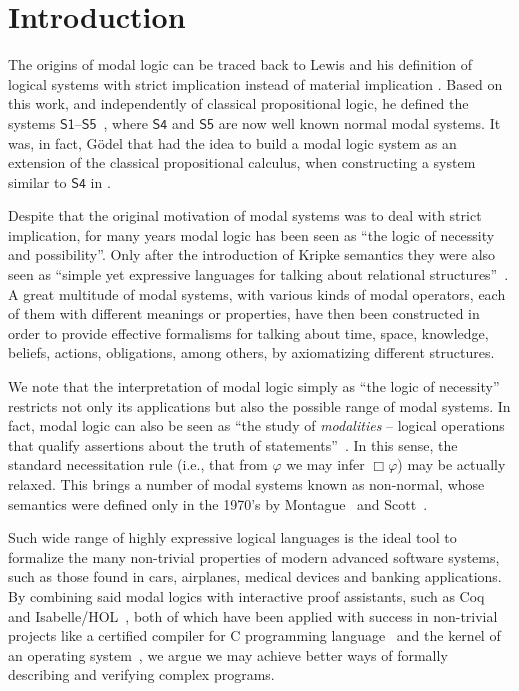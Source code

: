 \documentclass[3p,times]{elsarticle}
\begin{document}

\section{Introduction}\label{sec:intro}


The origins of modal logic can be traced back to Lewis and his definition of
logical systems with strict implication instead of material implication \cite{Lewis1918}.
Based on this work, and independently of classical propositional logic, he
defined the systems $\mathsf{S1}$--$\mathsf{S5}$~\cite{Lewis1932}, where $\mathsf{S4}$ and $\mathsf{S5}$
are now well known normal modal systems. It was, in fact, G{\"o}del that had the idea
to build a modal logic system as an extension of the classical propositional calculus,
when constructing a system similar to $\mathsf{S4}$ in \cite{Godel1933}.

Despite that the original motivation of modal systems was to deal with strict implication,
for many years modal logic has been seen as ``the logic of necessity and possibility''.
Only after the introduction of Kripke semantics they were also seen as ``simple yet
expressive languages for talking about relational structures''~\cite{Blackburn-ModalLogics}.
A great multitude of modal systems, with various kinds of modal operators, each of them with
different meanings or properties, have then been constructed in order to provide effective
formalisms for talking about time, space, knowledge, beliefs, actions,
obligations, among others, by axiomatizing different structures.

We note that the interpretation of modal logic simply as ``the logic of necessity'' restricts
not only its applications but also the possible range of modal systems. In fact, modal logic
can also be seen as ``the study of \emph{modalities} -- logical operations that qualify
assertions about the truth of statements''~\cite{Goldblatt-MathofModality}. In this sense,
the standard necessitation rule (i.e., that from $\varphi$ we may infer $\Box\varphi$) may be actually relaxed. This brings
a number of modal systems known as non-normal, whose semantics were defined only in the
1970's by Montague~\cite{Montague1970} and Scott~\cite{Scott_AdviceModal1970}.

Such wide range of highly expressive logical languages is the ideal tool to
formalize the many non-trivial properties of modern advanced software systems,
such as those found in cars, airplanes, medical devices and banking applications.
By combining said modal logics with interactive proof assistants,
such as Coq~\cite{manual_coq} and Isabelle/HOL~\cite{manual_isabelle}, both of
which have been applied with success in non-trivial projects like a certified compiler
for C programming language~\cite{Leroy09} and the kernel of an operating
system~\cite{Klein10},
we argue we may achieve better ways of formally describing and verifying complex programs.
\end{document}
